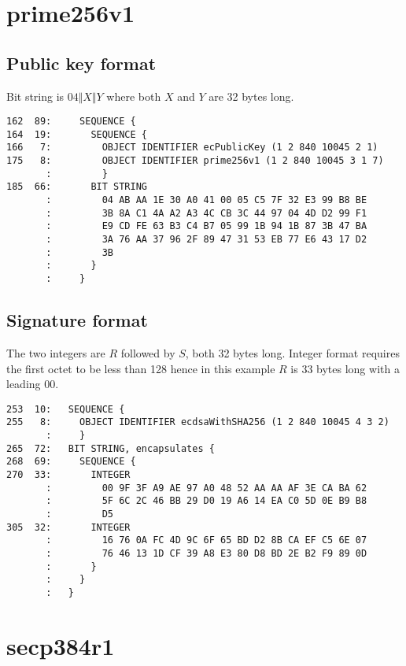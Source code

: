 \documentclass[12pt]{article}
\begin{document}
\section{prime256v1}

\subsection{Public key format}

\noindent
Bit string is $04\Vert X\Vert Y$ where both $X$ and $Y$ are 32 bytes long.

\begin{verbatim}
162  89:     SEQUENCE {
164  19:       SEQUENCE {
166   7:         OBJECT IDENTIFIER ecPublicKey (1 2 840 10045 2 1)
175   8:         OBJECT IDENTIFIER prime256v1 (1 2 840 10045 3 1 7)
       :         }
185  66:       BIT STRING
       :         04 AB AA 1E 30 A0 41 00 05 C5 7F 32 E3 99 B8 BE
       :         3B 8A C1 4A A2 A3 4C CB 3C 44 97 04 4D D2 99 F1
       :         E9 CD FE 63 B3 C4 B7 05 99 1B 94 1B 87 3B 47 BA
       :         3A 76 AA 37 96 2F 89 47 31 53 EB 77 E6 43 17 D2
       :         3B
       :       }
       :     }
\end{verbatim}

\subsection{Signature format}

\noindent
The two integers are $R$ followed by $S$, both 32 bytes long.
Integer format requires the first octet to be less than 128
hence in this example $R$ is 33 bytes long with a leading 00.

\begin{verbatim}
253  10:   SEQUENCE {
255   8:     OBJECT IDENTIFIER ecdsaWithSHA256 (1 2 840 10045 4 3 2)
       :     }
265  72:   BIT STRING, encapsulates {
268  69:     SEQUENCE {
270  33:       INTEGER
       :         00 9F 3F A9 AE 97 A0 48 52 AA AA AF 3E CA BA 62
       :         5F 6C 2C 46 BB 29 D0 19 A6 14 EA C0 5D 0E B9 B8
       :         D5
305  32:       INTEGER
       :         16 76 0A FC 4D 9C 6F 65 BD D2 8B CA EF C5 6E 07
       :         76 46 13 1D CF 39 A8 E3 80 D8 BD 2E B2 F9 89 0D
       :       }
       :     }
       :   }
\end{verbatim}

\newpage
\section{secp384r1}
\end{document}

